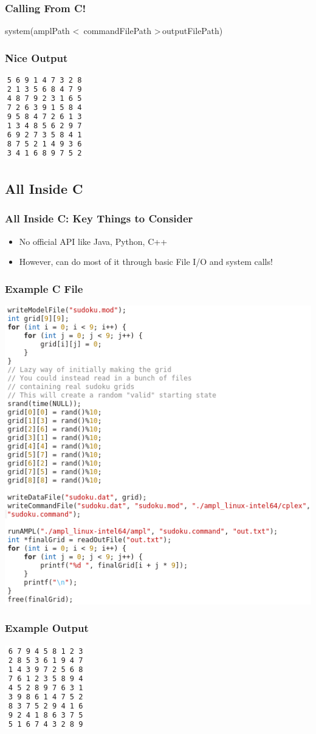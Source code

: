 \documentclass{beamer}
\begin{document}
   \begin{frame}
       \frametitle{Calling From C!}
        system(amplPath \textless \, commandFilePath \textgreater \,outputFilePath)
   \end{frame}
   \begin{frame}
       \frametitle{Nice Output}
        \centering
        \includegraphics[scale=.75]{figures/exampleOutput.png}
   \end{frame}
    \subsection{All Inside C}
    \begin{frame}
        \frametitle{All Inside C: Key Things to Consider}
        \begin{itemize}
            \item No official API like Java, Python, C++
            \item However, can do most of it through basic File I/O and system calls!
        \end{itemize}
    \end{frame}
    \begin{frame}
        \frametitle{Example C File}
        \centering
        \includegraphics[scale=.35]{figures/insideCCode.png}
    \end{frame}
    \begin{frame}
        \frametitle{Example Output}
        \centering
        \includegraphics[scale=.75]{figures/randomOutput.png}
    \end{frame}
\end{document}
